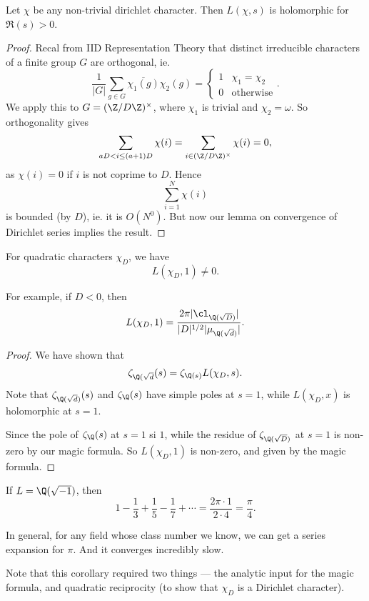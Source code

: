 \documentclass[a4paper]{article}
\begin{document}
\begin{lemma}
  Let $\chi$ be any non-trivial dirichlet character. Then $L(\chi, s)$ is holomorphic for $\Re(s) > 0$.
\end{lemma}

\begin{proof}
  Recal from IID Representation Theory that distinct irreducible characters of a finite group $G$ are orthogonal, ie.
  \[
    \frac{1}{|G|} \sum_{g \in G} \overline{\chi_1(g)} \chi_2(g) =
    \begin{cases}
      1 & \chi_1 = \chi_2\\
      0 & \text{otherwise}
    \end{cases}.
  \]
  We apply this to $G = (\Z/D\Z)^{\times}$, where $\chi_1$ is trivial and $\chi_2 = \omega$. So orthogonality gives
  \[
    \sum_{aD < i \leq (a + 1)D} \chi(i) = \sum_{i \in (\Z/D\Z)^\times} \chi(i) = 0,
  \]
  as $\chi(i) = 0$ if $i$ is not coprime to $D$. Hence
  \[
    \sum_{i = 1}^N \chi(i)
  \]
  is bounded (by $D$), ie. it is $O(N^0)$. But now our lemma on convergence of Dirichlet series implies the result.
\end{proof}

\begin{cor}
  For quadratic characters $\chi_D$, we have
  \[
    L(\chi_D, 1) \not= 0.
  \]
\end{cor}
For example, if $D < 0$, then
\[
  L(\chi_D, 1) = \frac{2 \pi |\cl_{\Q(\sqrt{D})}|}{|D|^{1/2} |\mu_{\Q(\sqrt{d})}|}.
\]
\begin{proof}
  We have shown that
  \[
    \zeta_{\Q(\sqrt{d}}(s) = \zeta_{\Q(s)} L(\chi_D, s).
  \]
  Note that $\zeta_{\Q(\sqrt{d})}(s)$ and $\zeta_{\Q}(s)$ have simple poles at $s = 1$, while $L(\chi_D, x)$ is holomorphic at $s = 1$.

  Since the pole of $\zeta_{\Q}(s)$ at $s = 1$ si $1$, while the residue of $\zeta_{\Q(\sqrt{D})}$ at $s = 1$ is non-zero by our magic formula. So $L(\chi_D, 1)$ is non-zero, and given by the magic formula.
\end{proof}

\begin{eg}
  If $L = \Q(\sqrt{-1})$, then
  \[
    1 - \frac{1}{3} + \frac{1}{5} - \frac{1}{7} + \cdots= \frac{2\pi \cdot 1}{2 \cdot 4} = \frac{\pi}{4}.
  \]
\end{eg}
In general, for any field whose class number we know, we can get a series expansion for $\pi$. And it converges incredibly slow.

Note that this corollary required two things --- the analytic input for the magic formula, and quadratic reciprocity (to show that $\chi_D$ is a Dirichlet character).
\end{document}

